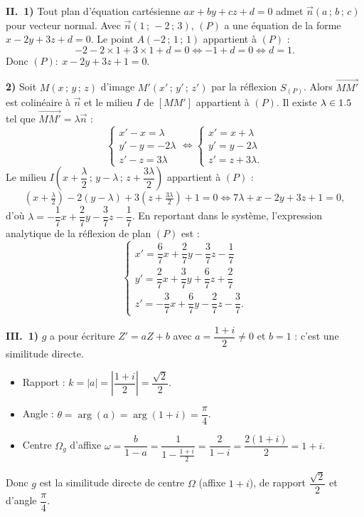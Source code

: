 \smallskip
\noindent\textbf{II.\ 1)} Tout plan d'équation cartésienne $ax+by+cz+d=0$ admet $\vec n(a\,;\,b\,;\,c)$ pour vecteur normal. Avec $\vec n(1\,;\,-2\,;\,3)$, $(P)$ a une équation de la forme $x-2y+3z+d=0$. Le point $A(-2\,;\,1\,;\,1)$ appartient à $(P)$ :
\[
-2-2\times1+3\times1+d=0\iff -1+d=0\iff d=1 .
\]
Donc $(P):\ x-2y+3z+1=0$.

\noindent\textbf{2)} Soit $M(x\,;\,y\,;\,z)$ d'image $M'(x'\,;\,y'\,;\,z')$ par la réflexion $S_{(P)}$. Alors $\overrightarrow{MM'}$ est colinéaire à $\vec n$ et le milieu $I$ de $[MM']$ appartient à $(P)$. Il existe $\lambda\in1.5$ tel que $\overrightarrow{MM'}=\lambda\vec n$ :
\[
\begin{cases}x'-x=\lambda\\y'-y=-2\lambda\\z'-z=3\lambda\end{cases}\iff
\begin{cases}x'=x+\lambda\\y'=y-2\lambda\\z'=z+3\lambda.\end{cases}
\]
Le milieu $I\left(x+\dfrac{\lambda}{2}\,;\,y-\lambda\,;\,z+\dfrac{3\lambda}{2}\right)$ appartient à $(P)$ :
\[
\left(x+\tfrac{\lambda}{2}\right)-2(y-\lambda)+3\left(z+\tfrac{3\lambda}{2}\right)+1=0\iff 7\lambda+x-2y+3z+1=0,
\]
d'où $\lambda=-\dfrac17 x+\dfrac27 y-\dfrac37 z-\dfrac17$. En reportant dans le système, l'expression analytique de la réflexion de plan $(P)$ est :
\[
\begin{cases}
x'=\dfrac67 x+\dfrac27 y-\dfrac37 z-\dfrac17\\[4pt]
y'=\dfrac27 x+\dfrac37 y+\dfrac67 z+\dfrac27\\[4pt]
z'=-\dfrac37 x+\dfrac67 y-\dfrac27 z-\dfrac37 .
\end{cases}
\]

\smallskip
\noindent\textbf{III.\ 1)} $g$ a pour écriture $Z'=aZ+b$ avec $a=\dfrac{1+i}{2}\neq0$ et $b=1$ : c'est une similitude directe.
\begin{itemize}
\item Rapport : $k=|a|=\left|\dfrac{1+i}{2}\right|=\dfrac{\sqrt2}{2}$.
\item Angle : $\theta=\arg(a)=\arg(1+i)=\dfrac{\pi}{4}$.
\item Centre $\Omega_g$ d'affixe $\omega=\dfrac{b}{1-a}=\dfrac{1}{1-\frac{1+i}{2}}=\dfrac{2}{1-i}=\dfrac{2(1+i)}{2}=1+i$.
\end{itemize}
Donc $g$ est la similitude directe de centre $\Omega$ (affixe $1+i$), de rapport $\dfrac{\sqrt2}{2}$ et d'angle $\dfrac{\pi}{4}$.

